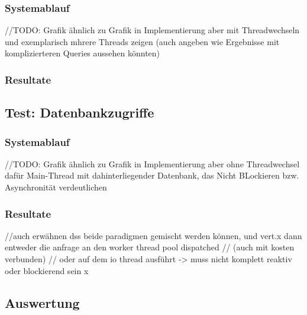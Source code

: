 \subsubsection{Systemablauf}
//TODO: Grafik ähnlich zu Grafik in Implementierung aber mit Threadwechseln und exemplarisch mhrere Threads zeigen
(auch angeben wie Ergebnisse mit komplizierteren Queries aussehen könnten)
\subsubsection{Resultate}

\subsection{Test: Datenbankzugriffe}
\label{section:datenbankzugriffe}

\subsubsection{Systemablauf}
//TODO: Grafik ähnlich zu Grafik in Implementierung aber ohne Threadwechsel dafür Main-Thread mit dahinterliegender Datenbank,
das Nicht BLockieren bzw. Asynchronität verdeutlichen

\subsubsection{Resultate}

//auch erwähnen dss beide paradigmen gemischt werden können, und vert.x dann entweder die anfrage an den worker thread pool dispatched
// (auch mit kosten verbunden)
// oder auf dem io thread ausführt -> muss nicht komplett reaktiv oder blockierend sein x
\subsection{Auswertung}
\label{section:auswertung}